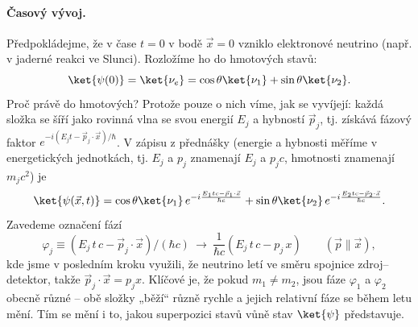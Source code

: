 \paragraph{Časový vývoj.} Předpokládejme, že v čase \(t=0\) v bodě \(\vec x=0\) vzniklo elektronové neutrino (např. v jaderné reakci ve Slunci). Rozložíme ho do hmotových stavů:
\begin{equation}
  \ket{\psi(0)}=\ket{\nu_e}=\cos\theta\ket{\nu_1}+\sin\theta\ket{\nu_2}.
\end{equation}
Proč právě do hmotových? Protože pouze o nich víme, jak se vyvíjejí: každá složka se šíří jako rovinná vlna se svou energií \(E_j\) a hybností \(\vec p_j\), tj. získává fázový faktor \(e^{-i(E_jt-\vec p_j\cdot\vec x)/\hbar}\). V zápisu z přednášky (energie a hybnosti měříme v energetických jednotkách, tj. \(E_j\) a \(p_j\) znamenají \(E_j\) a \(p_jc\), hmotnosti znamenají \(m_jc^2\)) je
\begin{equation}
  \ket{\psi(\vec x,t)}=\cos\theta\ket{\nu_1}\,e^{-i\frac{E_1tc-\vec p_1\cdot\vec x}{\hbar c}}
  +\sin\theta\ket{\nu_2}\,e^{-i\frac{E_2tc-\vec p_2\cdot\vec x}{\hbar c}}.
\end{equation}
Zavedeme označení fází
\begin{equation}
  \varphi_j\equiv\left(E_j\,t\,c-\vec p_j\cdot\vec x\right)/(\hbar c)\ \longrightarrow\ \frac{1}{\hbar c}\left(E_j\,t\,c-p_j\,x\right)\qquad(\vec p\parallel\vec x),
\end{equation}
kde jsme v posledním kroku využili, že neutrino letí ve směru spojnice zdroj--detektor, takže \(\vec p_j\cdot\vec x=p_jx\). Klíčové je, že pokud \(m_1\neq m_2\), jsou fáze \(\varphi_1\) a \(\varphi_2\) obecně různé -- obě složky „běží“ různě rychle a jejich relativní fáze se během letu mění. Tím se mění i to, jakou superpozici stavů vůně stav \(\ket{\psi}\) představuje.

